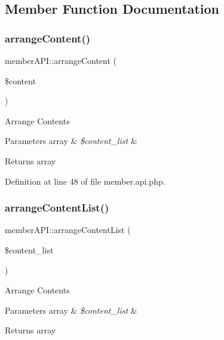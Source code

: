 \subsection{Member Function Documentation}
\mbox{\label{classmemberAPI_a2f05be1a71de779b38ea5c0e113969ea}} 
\subsubsection{\texorpdfstring{arrange\+Content()}{arrangeContent()}}
{\footnotesize\ttfamily member\+A\+P\+I\+::arrange\+Content (\begin{DoxyParamCaption}\item[{}]{\$content }\end{DoxyParamCaption})}

Arrange Contents


\begin{DoxyParams}[1]{Parameters}
array & {\em \$content\+\_\+list} & \\
\hline
\end{DoxyParams}
\begin{DoxyReturn}{Returns}
array 
\end{DoxyReturn}


Definition at line 48 of file member.\+api.\+php.

\mbox{\label{classmemberAPI_accb093980616ddbea40361249379a01b}} 
\subsubsection{\texorpdfstring{arrange\+Content\+List()}{arrangeContentList()}}
{\footnotesize\ttfamily member\+A\+P\+I\+::arrange\+Content\+List (\begin{DoxyParamCaption}\item[{}]{\$content\+\_\+list }\end{DoxyParamCaption})}

Arrange Contents


\begin{DoxyParams}[1]{Parameters}
array & {\em \$content\+\_\+list} & \\
\hline
\end{DoxyParams}
\begin{DoxyReturn}{Returns}
array 
\end{DoxyReturn}


